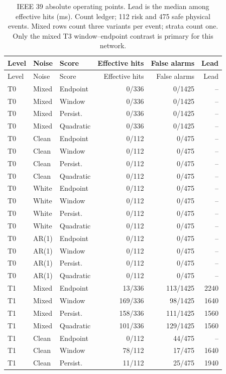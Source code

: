 \documentclass[10pt]{article}
\begin{document}
\begin{longtable}{lllrrr}
\caption{IEEE 39 absolute operating points. Lead is the median among effective hits (ms). Count ledger; 112 risk and 475 safe physical events. Mixed rows count three variants per event; strata count one. Only the mixed T3 window--endpoint contrast is primary for this network.}\\
\toprule Level & Noise & Score & Effective hits & False alarms & Lead \\\midrule\endfirsthead
\toprule Level & Noise & Score & Effective hits & False alarms & Lead \\\midrule\endhead
T0 & Mixed & Endpoint & 0/336 & 0/1425 & -- \\
T0 & Mixed & Window & 0/336 & 0/1425 & -- \\
T0 & Mixed & Persist. & 0/336 & 0/1425 & -- \\
T0 & Mixed & Quadratic & 0/336 & 0/1425 & -- \\
T0 & Clean & Endpoint & 0/112 & 0/475 & -- \\
T0 & Clean & Window & 0/112 & 0/475 & -- \\
T0 & Clean & Persist. & 0/112 & 0/475 & -- \\
T0 & Clean & Quadratic & 0/112 & 0/475 & -- \\
T0 & White & Endpoint & 0/112 & 0/475 & -- \\
T0 & White & Window & 0/112 & 0/475 & -- \\
T0 & White & Persist. & 0/112 & 0/475 & -- \\
T0 & White & Quadratic & 0/112 & 0/475 & -- \\
T0 & AR(1) & Endpoint & 0/112 & 0/475 & -- \\
T0 & AR(1) & Window & 0/112 & 0/475 & -- \\
T0 & AR(1) & Persist. & 0/112 & 0/475 & -- \\
T0 & AR(1) & Quadratic & 0/112 & 0/475 & -- \\
T1 & Mixed & Endpoint & 13/336 & 113/1425 & 2240 \\
T1 & Mixed & Window & 169/336 & 98/1425 & 1640 \\
T1 & Mixed & Persist. & 158/336 & 111/1425 & 1560 \\
T1 & Mixed & Quadratic & 101/336 & 129/1425 & 1560 \\
T1 & Clean & Endpoint & 0/112 & 44/475 & -- \\
T1 & Clean & Window & 78/112 & 17/475 & 1640 \\
T1 & Clean & Persist. & 11/112 & 25/475 & 1940 \\

\end{longtable}
\end{document}
